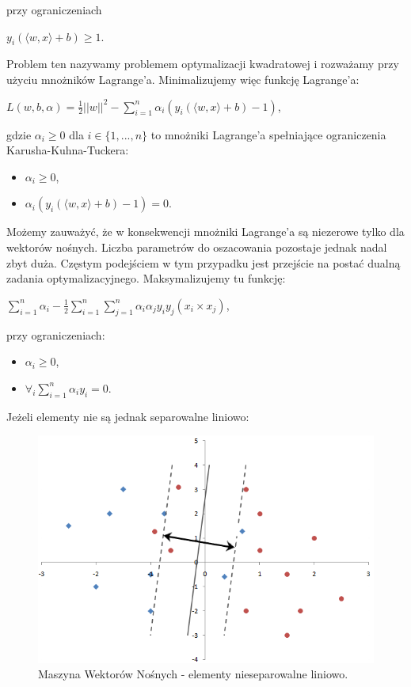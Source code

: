 \documentclass[12pt,a4paper]{report}
\begin{document}
przy ograniczeniach
\begin{center}
$y_i(\langle w,x \rangle + b) \geq 1$.
\end{center}
Problem ten nazywamy problemem optymalizacji kwadratowej i rozważamy przy użyciu mnożników Lagrange'a. Minimalizujemy więc funkcję Lagrange'a:
\begin{center}
$L(w,b,\alpha)=\frac{1}{2}||w||^2 - \sum_{i=1}^n \alpha_i(y_i(\langle w,x \rangle + b)-1)$, 
\end{center}
gdzie
$\alpha_i \geq 0$ dla $i \in \{1,...,n\}$ to mnożniki Lagrange'a spełniające ograniczenia Karusha-Kuhna-Tuckera:
\begin{itemize}
\item $\alpha_i \geq 0$,
\item $\alpha_i(y_i(\langle w,x \rangle + b)-1) = 0$.
\end{itemize}
Możemy zauważyć, że w konsekwencji mnożniki Lagrange'a są niezerowe tylko dla wektorów nośnych. Liczba parametrów do oszacowania pozostaje jednak nadal zbyt duża. Częstym podejściem w tym przypadku jest przejście na postać dualną zadania optymalizacyjnego.
Maksymalizujemy tu funkcję:\begin{center}
$\sum_{i=1}^n \alpha_i - \frac{1}{2} \sum_{i=1}^n \sum_{j=1}^{n} \alpha_i \alpha_j y_i y_j(x_i \times x_j)$,
\end{center}
przy ograniczeniach:
\begin{itemize}
\item $\alpha_i \geq 0$,
\item $\forall_i \sum_{i=1}^n \alpha_i y_i =0$.
\end{itemize}
\bigskip
\bigskip
\bigskip
Jeżeli elementy nie są jednak separowalne liniowo:
\begin{center}
\begin{figure}[H]
\centering
\includegraphics[scale=0.5]{SVM2.PNG} 
\caption{Maszyna Wektorów Nośnych - elementy nieseparowalne liniowo.}
\end{figure}
\end{center}
\end{document}

